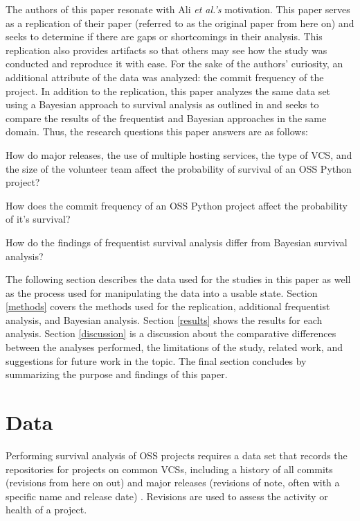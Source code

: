 \documentclass[acmconf]{acmart}
\begin{document}
The authors of this paper resonate with Ali \emph{et al.'s} motivation. 
This paper serves as a replication of their paper \cite{ali2020cheating} (referred to as the original paper from here on)  and seeks to determine if there are gaps or shortcomings in their analysis.
This replication also provides artifacts so that others may see how the study was conducted and reproduce it with ease.
For the sake of the authors' curiosity, an additional attribute of the data was analyzed: the commit frequency of the project.
In addition to the replication, this paper analyzes the same data set using a Bayesian approach to survival analysis as outlined in \cite{kelter2020bayesian} and seeks to compare the results of the frequentist and Bayesian approaches in the same domain.
Thus, the research questions this paper answers are as follows:

\begin{questions}
    \item How do major releases, the use of multiple hosting services, the type of VCS, and the size of the volunteer team affect the probability of survival of an OSS Python project?
    \item How does the commit frequency of an OSS Python project affect the probability of it's survival?
    \item How do the findings of frequentist survival analysis differ from Bayesian survival analysis?
\end{questions}

The following section describes the data used for the studies in this paper as well as the process used for manipulating the data into a usable state.
Section \ref{methods} covers the methods used for the replication, additional frequentist analysis, and Bayesian analysis.
Section \ref{results} shows the results for each analysis.
Section \ref{discussion} is a discussion about the comparative differences between the analyses performed, the limitations of the study, related work, and suggestions for future work in the topic.
The final section concludes by summarizing the purpose and findings of this paper. 

\section{Data} \label{data}

Performing survival analysis of OSS projects requires a data set that records the repositories for projects on common VCSs, including a history of all commits (revisions from here on out) and major releases (revisions of note, often with a specific name and release date) \cite{ali2020cheating}.
Revisions are used to assess the activity or health of a project.
\end{document}
